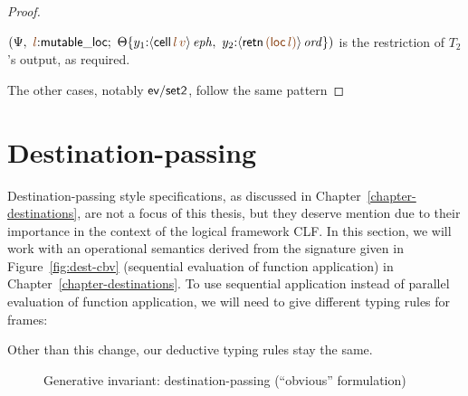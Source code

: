 \begin{proof}
\begin{description}
$\left(\Psi, ~ \lf{l}{:}{\sf mutable\_loc}; ~
   \tackon{\Theta}{y_1{:}\iseph{\susp{{\sf cell}\,\lf{l}\,\lf{v}}}, ~
                   y_2{:}\istrue{\susp{{\sf retn}\,\lf{({\sf loc}\,\lf{l})}}}}
   \right)$ is the restriction of $T_2$'s output, as
required.






\end{description}
The other cases, notably ${\sf ev/set2}$, follow the 
same pattern
\end{proof}

\section{Destination-passing}
\label{sec:gen-destinations}

Destination-passing style specifications, as discussed in
Chapter~\ref{chapter-destinations}, are not a focus of this thesis,
but they deserve mention due to their importance in the context of the
logical framework CLF. In this section, we will work with an
operational semantics derived from the signature given in
Figure~\ref{fig:dest-cbv} (sequential evaluation of function
application) in Chapter~\ref{chapter-destinations}. To use sequential
application instead of parallel evaluation of function application, we
will need to give different typing rules for frames:

\smallskip
{}
\smallskip

\noindent
Other than this change, our deductive typing rules stay the same.


\begin{figure}[tp]
\caption{Generative invariant: destination-passing (``obvious'' formulation)}
\label{fig:gen-destinations2} 
\end{figure}

